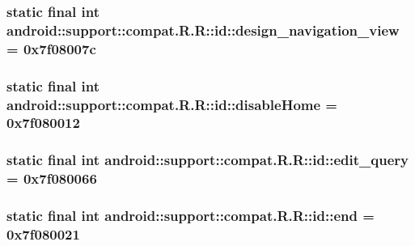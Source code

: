 \hypertarget{classandroid_1_1support_1_1compat_1_1_r_1_1id_64393888afef149674f363690b0fd552}{
\subsubsection[{design\_\-navigation\_\-view}]{\setlength{\rightskip}{0pt plus 5cm}static final int android::support::compat.R.R::id::design\_\-navigation\_\-view = 0x7f08007c}}
\label{classandroid_1_1support_1_1compat_1_1_r_1_1id_64393888afef149674f363690b0fd552}


\hypertarget{classandroid_1_1support_1_1compat_1_1_r_1_1id_9b584a7e9424229fedf4798ca8cac0a2}{
\subsubsection[{disableHome}]{\setlength{\rightskip}{0pt plus 5cm}static final int android::support::compat.R.R::id::disableHome = 0x7f080012}}
\label{classandroid_1_1support_1_1compat_1_1_r_1_1id_9b584a7e9424229fedf4798ca8cac0a2}


\hypertarget{classandroid_1_1support_1_1compat_1_1_r_1_1id_9bf330c2fdd765351f76fbdf688fa4e6}{
\subsubsection[{edit\_\-query}]{\setlength{\rightskip}{0pt plus 5cm}static final int android::support::compat.R.R::id::edit\_\-query = 0x7f080066}}
\label{classandroid_1_1support_1_1compat_1_1_r_1_1id_9bf330c2fdd765351f76fbdf688fa4e6}


\hypertarget{classandroid_1_1support_1_1compat_1_1_r_1_1id_5390cea05fc5aa52f62c14ff95780ede}{
\subsubsection[{end}]{\setlength{\rightskip}{0pt plus 5cm}static final int android::support::compat.R.R::id::end = 0x7f080021}}
\label{classandroid_1_1support_1_1compat_1_1_r_1_1id_5390cea05fc5aa52f62c14ff95780ede}


